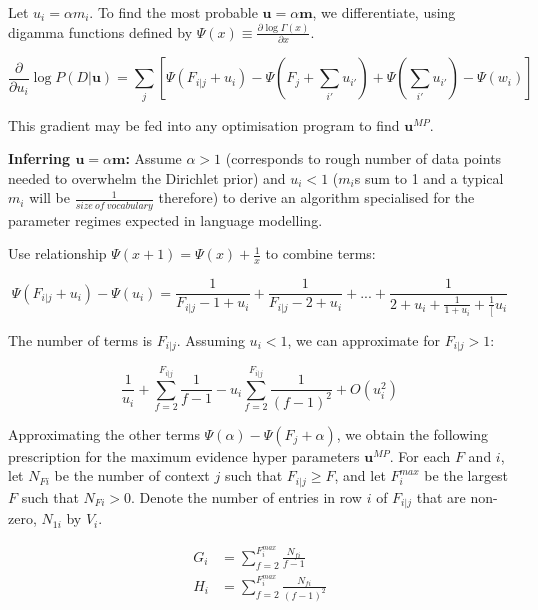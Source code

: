 Let $u_{i}=\alpha m_{i}$. To find the most probable $\boldsymbol{u}=\alpha\boldsymbol{m}$, we differentiate, using digamma functions defined by $\Psi(x)\equiv \frac{\partial \log \Gamma(x)}{\partial x}$. 

\begin{equation}
\frac{\partial}{\partial u_{i}}\log P(D|\boldsymbol{u})=\sum_{j}\left[\Psi(F_{i|j}+u_{i})-\Psi\left(F_{j}+\sum_{i'}u_{i'}\right)+\Psi\left(\sum_{i'}u_{i'}\right)-\Psi(w_{i})\right]
\end{equation}

\noindent This gradient may be fed into any optimisation program to find $\boldsymbol{u}^{MP}$.

\textbf{Inferring $\boldsymbol{u}=\alpha\boldsymbol{m}$: } Assume $\alpha>1$ (corresponds to rough number of data points needed to overwhelm the Dirichlet prior) and $u_{i}<1$ ($m_{i}$s sum to 1 and a typical $m_{i}$ will be $\frac{1}{size\ of\ vocabulary}$ therefore) to derive an algorithm specialised for the parameter regimes expected in language modelling.

Use relationship $\Psi(x+1)=\Psi(x)+\frac{1}{x}$ to combine terms:

\begin{equation}
\Psi(F_{i|j}+u_{i})-\Psi(u_{i})=\frac{1}{F_{i|j}-1+u_{i}}+\frac{1}{F_{i|j}-2+u_{i}}+...+\frac{1}{2+u_{i}+\frac{1}{1+u_{i}}+\frac{1}[u_{i}}
\end{equation}

\noindent The number of terms is $F_{i|j}$. Assuming $u_{i}<1$, we can approximate for $F_{i|j}>1$:

\begin{equation}
\frac{1}{u_{i}}+\sum_{f=2}^{F_{i|j}}\frac{1}{f-1}-u_{i}\sum_{f=2}^{F_{i|j}}\frac{1}{(f-1)^{2}}+O(u_{i}^{2})
\end{equation}

Approximating the other terms $\Psi(\alpha)-\Psi(F_{j}+\alpha)$, we obtain the following prescription for the maximum evidence hyper parameters $\boldsymbol{u}^{MP}$. For each $F$ and $i$, let $N_{Fi}$ be the number of context $j$ such that $F_{i|j}\geq F$, and let $F_{i}^{max}$ be the largest $F$ such that $N_{Fi}>0$. Denote the number of entries in row $i$ of $F_{i|j}$ that are non-zero, $N_{1i}$ by $V_{i}$.

\begin{align}
G_{i} &= \sum_{f=2}^{F_{i}^{max}}\frac{N_{fi}}{f-1}
\\
H_{i} &= \sum_{f=2}^{F_{i}^{max}}\frac{N_{fi}}{(f-1)^{2}}
\end{align}

